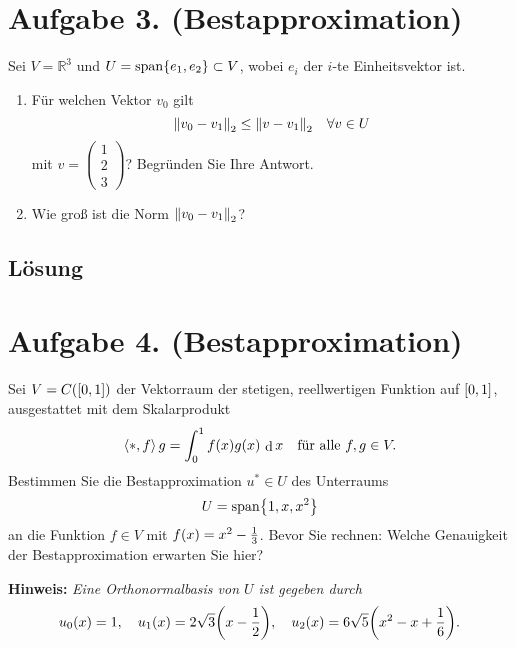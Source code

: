 \documentclass[german,12pt]{homework}
\newcommand{\RR}{\mathbb{R}}
\newcommand{\dotproduct}[2]{\left\langle{#1, #2}\right\rangle}
\newcommand{\dd}{\,\differ}
\DeclareMathOperator{\differ}{d}
\DeclareMathOperator{\vecspan}{span}
\DeclarePairedDelimiter{\norm}{\lVert}{\rVert}
\DeclarePairedDelimiter{\enbrace}{(}{)}
\DeclarePairedDelimiter{\benbrace}{[}{]}
\DeclarePairedDelimiter{\penbrace}{\{}{\}}
\begin{document}
    \section*{Aufgabe 3. (Bestapproximation)}

    \begin{problem}
        Sei \(V = \RR^3\) und \(U = \vecspan\penbrace*{e_1, e_2} \subset V\),
        wobei \(e_i\) der \(i\)-te Einheitsvektor ist.
        \begin{enumerate}
            \item Für welchen Vektor \(v_0\) gilt
            \[\norm*{v_0 - v_1}_2 \le \norm*{v - v_1}_2 \quad \forall{v \in U}\]
            mit \(v = \begin{pmatrix}1\\2\\3\end{pmatrix}\)? Begründen Sie Ihre
            Antwort.
            \item Wie groß ist die Norm \(\norm*{v_0 - v_1}_2\)?
        \end{enumerate}
    \end{problem}

    \subsection*{Lösung}

    \section*{Aufgabe 4. (Bestapproximation)}

    \begin{problem}
        Sei \(V = C\enbrace*{\benbrace*{0, 1}}\) der Vektorraum der stetigen,
        reellwertigen Funktion auf \(\benbrace*{0, 1}\), ausgestattet mit dem
        Skalarprodukt
        \[\dotproduct*{f}{g} = \int_0^1f\enbrace*{x}g\enbrace*{x}\dd{x} \quad
        \text{für alle }f, g \in V.\]
        Bestimmen Sie die Bestapproximation \(u^* \in U\) des Unterraums
        \[U = \vecspan\penbrace*{1, x, x^2}\]
        an die Funktion \(f \in V\) mit \(f\enbrace*{x} = x^2 - \frac{1}{3}\).
        Bevor Sie rechnen: Welche Genauigkeit der Bestapproximation erwarten
        Sie hier?

        \textbf{Hinweis:} \quad \emph{Eine Orthonormalbasis von \(U\) ist
        gegeben durch
        \[u_0\enbrace*{x} = 1, \quad u_1\enbrace*{x} = 2\sqrt{3}\enbrace*{x -
        \frac{1}{2}}, \quad u_2\enbrace*{x} = 6\sqrt{5}\enbrace*{x^2 - x +
        \frac{1}{6}}.\]}
    \end{problem}
\end{document}

